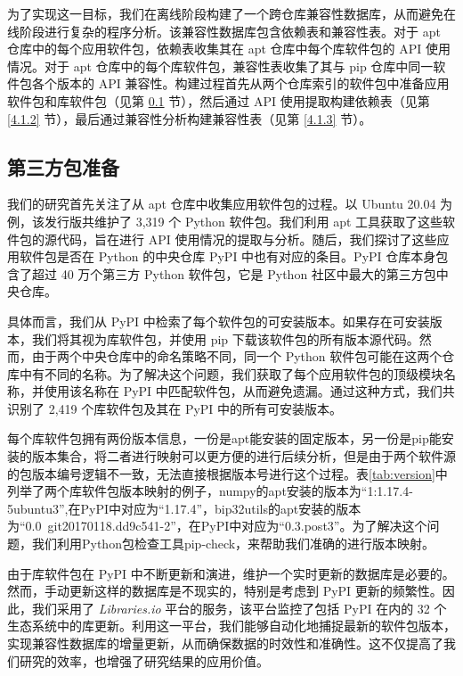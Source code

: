 为了实现这一目标，我们在离线阶段构建了一个跨仓库兼容性数据库，从而避免在线阶段进行复杂的程序分析。该兼容性数据库包含依赖表和兼容性表。对于 apt 仓库中的每个应用软件包，依赖表收集其在 apt 仓库中每个库软件包的 API 使用情况。对于 apt 仓库中的每个库软件包，兼容性表收集了其与 pip 仓库中同一软件包各个版本的 API 兼容性。构建过程首先从两个仓库索引的软件包中准备应用软件包和库软件包（见第 \ref{4.1.1} 节），然后通过 API 使用提取构建依赖表（见第 \ref{4.1.2} 节），最后通过兼容性分析构建兼容性表（见第 \ref{4.1.3} 节）。

\subsection{第三方包准备}\label{4.1.1}
我们的研究首先关注了从 apt 仓库中收集应用软件包的过程。以 Ubuntu 20.04 为例，该发行版共维护了 3,319 个 Python 软件包。我们利用 apt 工具获取了这些软件包的源代码，旨在进行 API 使用情况的提取与分析。随后，我们探讨了这些应用软件包是否在 Python 的中央仓库 PyPI  中也有对应的条目。PyPI 仓库本身包含了超过 40 万个第三方 Python 软件包，它是 Python 社区中最大的第三方包中央仓库。

具体而言，我们从 PyPI 中检索了每个软件包的可安装版本。如果存在可安装版本，我们将其视为库软件包，并使用 pip 下载该软件包的所有版本源代码。然而，由于两个中央仓库中的命名策略不同，同一个 Python 软件包可能在这两个仓库中有不同的名称。为了解决这个问题，我们获取了每个应用软件包的顶级模块名称，并使用该名称在 PyPI 中匹配软件包，从而避免遗漏。通过这种方式，我们共识别了 2,419 个库软件包及其在 PyPI 中的所有可安装版本。

每个库软件包拥有两份版本信息，一份是apt能安装的固定版本，另一份是pip能安装的版本集合，将二者进行映射可以更方便的进行后续分析，但是由于两个软件源的包版本编号逻辑不一致，无法直接根据版本号进行这个过程。表\ref{tab:version}中列举了两个库软件包版本映射的例子，numpy的apt安装的版本为“1:1.17.4-5ubuntu3”,在PyPI中对应为“1.17.4”，bip32utils的apt安装的版本为“0.0~git20170118.dd9c541-2”，在PyPI中对应为“0.3.post3”。为了解决这个问题，我们利用Python包检查工具pip-check，来帮助我们准确的进行版本映射。


由于库软件包在 PyPI 中不断更新和演进，维护一个实时更新的数据库是必要的。然而，手动更新这样的数据库是不现实的，特别是考虑到 PyPI 更新的频繁性。因此，我们采用了 \textit{Libraries.io}  平台的服务，该平台监控了包括 PyPI 在内的 32 个生态系统中的库更新。利用这一平台，我们能够自动化地捕捉最新的软件包版本，实现兼容性数据库的增量更新，从而确保数据的时效性和准确性。这不仅提高了我们研究的效率，也增强了研究结果的应用价值。

